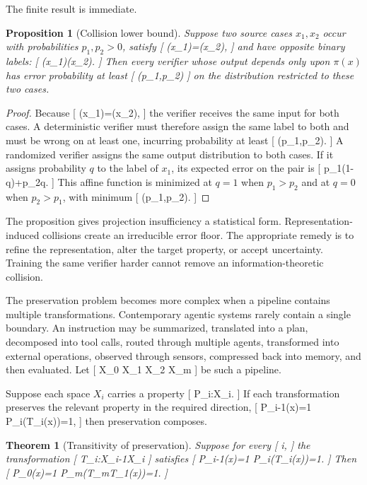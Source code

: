\documentclass[11pt]{article}
\newtheorem{theorem}{Theorem} \newtheorem{proposition}{Proposition} \newtheorem{lemma}{Lemma} \newtheorem{corollary}{Corollary} \newtheorem{definition}{Definition} \newtheorem{remark}{Remark}
\begin{document}
The finite result is immediate.

\begin{proposition}[Collision lower bound]
Suppose two source cases $x_1,x_2$ occur with probabilities $p_1,p_2>0$, satisfy
[
\pi(x_1)=\pi(x_2),
]
and have opposite binary labels:
[
\Phi(x_1)\neq\Phi(x_2).
]
Then every verifier whose output depends only upon $\pi(x)$ has error probability at least
[
\min(p_1,p_2)
]
on the distribution restricted to these two cases.
\end{proposition}

\begin{proof}
Because
[
\pi(x_1)=\pi(x_2),
]
the verifier receives the same input for both cases. A deterministic verifier must therefore assign the same label to both and must be wrong on at least one, incurring probability at least
[
\min(p_1,p_2).
]
A randomized verifier assigns the same output distribution to both cases. If it assigns probability $q$ to the label of $x_1$, its expected error on the pair is
[
p_1(1-q)+p_2q.
]
This affine function is minimized at $q=1$ when $p_1>p_2$ and at $q=0$ when $p_2>p_1$, with minimum
[
\min(p_1,p_2).
]
\end{proof}

The proposition gives projection insufficiency a statistical form. Representation-induced collisions create an irreducible error floor. The appropriate remedy is to refine the representation, alter the target property, or accept uncertainty. Training the same verifier harder cannot remove an information-theoretic collision.

The preservation problem becomes more complex when a pipeline contains multiple transformations. Contemporary agentic systems rarely contain a single boundary. An instruction may be summarized, translated into a plan, decomposed into tool calls, routed through multiple agents, transformed into external operations, observed through sensors, compressed back into memory, and then evaluated. Let
[
X_0
X_1
X_2
\cdots
{}
X_m
]
be such a pipeline.

Suppose each space $X_i$ carries a property
[
P_i:X_i.
]
If each transformation preserves the relevant property in the required direction,
[
P_{i-1}(x)=1
\Longrightarrow
P_i(T_i(x))=1,
]
then preservation composes.

\begin{theorem}[Transitivity of preservation]
Suppose for every
[
i,
]
the transformation
[
T_i:X_{i-1}\rightarrow X_i
]
satisfies
[
P_{i-1}(x)=1
\Longrightarrow
P_i(T_i(x))=1.
]
Then
[
P_0(x)=1
\Longrightarrow
P_m\bigl(T_m\circ\cdots\circ T_1(x)\bigr)=1.
]
\end{theorem}
\end{document}
